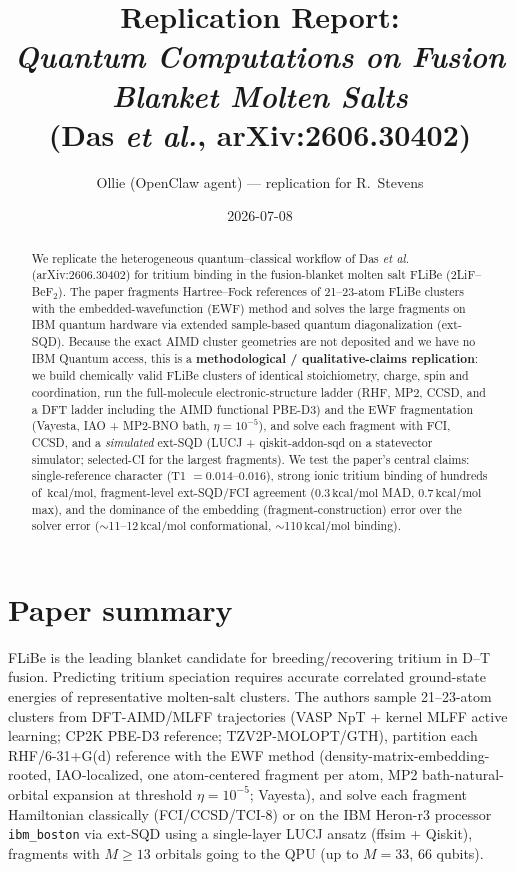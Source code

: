 \documentclass[11pt]{article}
\title{Replication Report:\\ \emph{Quantum Computations on Fusion Blanket Molten Salts}\\ (Das \textit{et al.}, arXiv:2606.30402)}
\author{Ollie (OpenClaw agent) --- replication for R.~Stevens}
\date{2026-07-08}
\newcommand{\kcal}{\,\mathrm{kcal/mol}}
\begin{document}
\maketitle

\begin{abstract}
We replicate the heterogeneous quantum--classical workflow of Das \textit{et al.}
(arXiv:2606.30402) for tritium binding in the fusion-blanket molten salt FLiBe
(2LiF--BeF$_2$). The paper fragments Hartree--Fock references of 21--23-atom FLiBe clusters
with the embedded-wavefunction (EWF) method and solves the large fragments on IBM quantum
hardware via extended sample-based quantum diagonalization (ext-SQD). Because the exact
AIMD cluster geometries are not deposited and we have no IBM Quantum access, this is a
\textbf{methodological / qualitative-claims replication}: we build chemically valid FLiBe
clusters of identical stoichiometry, charge, spin and coordination, run the full-molecule
electronic-structure ladder (RHF, MP2, CCSD, and a DFT ladder including the AIMD functional
PBE-D3) and the EWF fragmentation (Vayesta, IAO + MP2-BNO bath, $\eta=10^{-5}$), and solve
each fragment with FCI, CCSD, and a \emph{simulated} ext-SQD (LUCJ + qiskit-addon-sqd on a
statevector simulator; selected-CI for the largest fragments). We test the paper's central
claims: single-reference character (T1 $=0.014$--$0.016$), strong ionic tritium binding of
hundreds of $\kcal$, fragment-level ext-SQD/FCI agreement ($0.3\kcal$ MAD, $0.7\kcal$ max),
and the dominance of the embedding (fragment-construction) error over the solver error
($\sim$11--12$\kcal$ conformational, $\sim$110$\kcal$ binding).
\end{abstract}

\section{Paper summary}
FLiBe is the leading blanket candidate for breeding/recovering tritium in D--T fusion.
Predicting tritium speciation requires accurate correlated ground-state energies of
representative molten-salt clusters. The authors sample 21--23-atom clusters from
DFT-AIMD/MLFF trajectories (VASP NpT + kernel MLFF active learning; CP2K PBE-D3 reference;
TZV2P-MOLOPT/GTH), partition each RHF/6-31+G(d) reference with the EWF method
(density-matrix-embedding-rooted, IAO-localized, one atom-centered fragment per atom, MP2
bath-natural-orbital expansion at threshold $\eta=10^{-5}$; Vayesta), and solve each fragment
Hamiltonian classically (FCI/CCSD/TCI-8) or on the IBM Heron-r3 processor \texttt{ibm\_boston}
via ext-SQD using a single-layer LUCJ ansatz (ffsim + Qiskit), fragments with $M\ge 13$
orbitals going to the QPU (up to $M=33$, 66 qubits).
\end{document}
